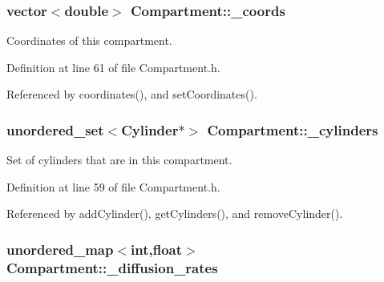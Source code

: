 \hypertarget{classCompartment_a065b6c2a3018b3de7404f56819908d2e}{
\subsubsection[{\+\_\+coords}]{\setlength{\rightskip}{0pt plus 5cm}vector$<$double$>$ Compartment\+::\+\_\+coords\hspace{0.3cm}{\ttfamily [protected]}}}\label{classCompartment_a065b6c2a3018b3de7404f56819908d2e}


Coordinates of this compartment. 



Definition at line 61 of file Compartment.\+h.



Referenced by coordinates(), and set\+Coordinates().

\hypertarget{classCompartment_aa2ff682579186097ddf444b3dafb1370}{
\subsubsection[{\+\_\+cylinders}]{\setlength{\rightskip}{0pt plus 5cm}unordered\+\_\+set$<${\bf Cylinder}$\ast$$>$ Compartment\+::\+\_\+cylinders\hspace{0.3cm}{\ttfamily [protected]}}}\label{classCompartment_aa2ff682579186097ddf444b3dafb1370}


Set of cylinders that are in this compartment. 



Definition at line 59 of file Compartment.\+h.



Referenced by add\+Cylinder(), get\+Cylinders(), and remove\+Cylinder().

\hypertarget{classCompartment_a92081814841d9bacca088eb55381f89c}{
\subsubsection[{\+\_\+diffusion\+\_\+rates}]{\setlength{\rightskip}{0pt plus 5cm}unordered\+\_\+map$<$int,float$>$ Compartment\+::\+\_\+diffusion\+\_\+rates\hspace{0.3cm}{\ttfamily [protected]}}}\label{classCompartment_a92081814841d9bacca088eb55381f89c}


